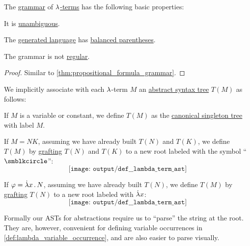 \begin{proposition}\label{thm:lambda_term_grammar}
  The \hyperref[def:formal_grammar]{grammar} of \hyperref[def:lambda_term]{\( {\mathrm \lambda} \)-terms} has the following basic properties:
  \begin{thmenum}
     It is \hyperref[def:grammar_ambiguity]{unambiguous}.

     The \hyperref[def:formal_grammar/language]{generated language} has \hyperref[def:paired_delimiters]{balanced parentheses}.

     The grammar is not \hyperref[def:chomsky_hierarchy/regular]{regular}.
  \end{thmenum}
\end{proposition}
\begin{proof}
  Similar to \cref{thm:propositional_formula_grammar}.
\end{proof}

\begin{definition}\label{def:lambda_term_ast}\mimprovised
  We implicitly associate with each \( {\mathrm \lambda} \)-term \( M \) an \hyperref[con:abstract_syntax_tree]{abstract syntax tree} \( T(M) \) as follows:
  \begin{thmenum}
     If \( M \) is a variable or constant, we define \( T(M) \) as the \hyperref[def:canonical_singleton_tree]{canonical singleton tree} with label \( M \).

     If \( M = NK \), assuming we have already built \( T(N) \) and \( T(K) \), we define \( T(M) \) by \hyperref[def:ordered_tree_grafting_product]{grafting} \( T(N) \) and \( T(K) \) to a new root labeled with the symbol \enquote{\( \anon \)}:
    \begin{equation*}
      \texttt{[image: output/def\_\_lambda\_term\_ast]}
    \end{equation*}

     If \( \varphi = \qabs x N \), assuming we have already built \( T(N) \), we define \( T(M) \) by \hyperref[def:ordered_tree_grafting_product]{grafting} \( T(N) \) to a new root labeled with \( \mathord{\dot{{\mathrm \lambda}}} x \):
    \begin{equation*}
      \texttt{[image: output/def\_\_lambda\_term\_ast]}
    \end{equation*}
  \end{thmenum}
\end{definition}
\begin{comments}
  \item Formally our ASTs for abstractions require us to \enquote{parse} the string at the root. They are, however, convenient for defining variable occurrences in \cref{def:lambda_variable_occurrence}, and are also easier to parse visually.
\end{comments}

